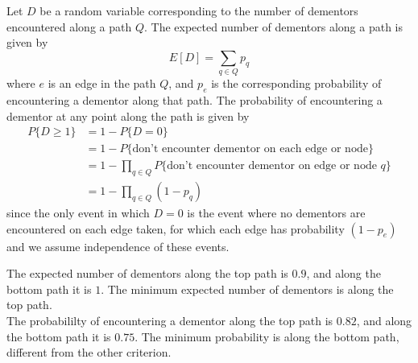 \documentclass[12pt]{article}
\begin{document}
\begin{enumerate}
\begin{enumerate}
        Let $D$ be a random variable corresponding to the number of dementors encountered along a path $Q$. The expected number of dementors along a path is 
given by 
        \[
            E[D] = \sum_{q \in Q} p_q
        \]
        where $e$ is an edge in the path $Q$, and $p_e$ is the corresponding probability of encountering a dementor along that path. The probability of 
encountering a dementor at any point along the path is given by 
        \begin{align*}
            P\{D \geq 1\} &= 1 - P\{D = 0\}\\
            &= 1 - P\{\text{don't encounter dementor on each edge or node}\}\\
            &= 1 - \prod_{q \in Q} P\{\text{don't encounter dementor on edge or node } q\}\\
            &= 1 - \prod_{q \in Q} (1 - p_q)
        \end{align*}
        since the only event in which $D=0$ is the event where no dementors are encountered on each edge taken, for which each edge has probability $(1 - 
p_e)$ and we assume independence of these events.\\
        
        \begin{center}
        \end{center}
        
        The expected number of dementors along the top path is $0.9$, and along the bottom path it is $1$. The minimum expected number of dementors is along 
the top path.\\
        
        The probabililty of encountering a dementor along the top path is $0.82$, and along the bottom path it is $0.75$. The minimum probability is along the 
bottom path, different from the other criterion.\\
        

\end{enumerate}
\end{enumerate}
\end{document}
